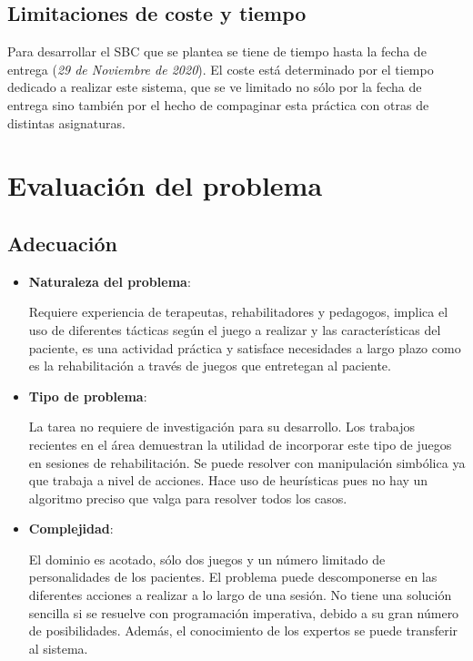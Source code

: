 \documentclass{uc3mpracticas}
\begin{document}
  \subsection{Limitaciones de coste y tiempo}

  Para desarrollar el SBC que se plantea se tiene de tiempo hasta la fecha de entrega (\textit{29 de Noviembre de 2020}). El coste está determinado por el tiempo dedicado a realizar este sistema, que se ve limitado no sólo por la fecha de entrega sino también por el hecho de compaginar esta práctica con otras de distintas asignaturas.

  \section{Evaluación del problema}
  \subsection{Adecuación}

  \begin{itemize}
    \item \textbf{Naturaleza del problema}:

    Requiere experiencia de terapeutas, rehabilitadores y pedagogos, implica el uso de diferentes tácticas según el juego a realizar y las características del paciente, es una actividad práctica y satisface necesidades a largo plazo como es la rehabilitación a través de juegos que entretegan al paciente.

    \item \textbf{Tipo de problema}:

    La tarea no requiere de investigación para su desarrollo. Los trabajos recientes en el área demuestran la utilidad de incorporar este tipo de juegos en sesiones de rehabilitación. Se puede resolver con manipulación simbólica ya que trabaja a nivel de acciones. Hace uso de heurísticas pues no hay un algoritmo preciso que valga para resolver todos los casos.

    \item \textbf{Complejidad}:

    El dominio es acotado, sólo dos juegos y un número limitado de personalidades de los pacientes. El problema puede descomponerse en las diferentes acciones a realizar a lo largo de una sesión. No tiene una solución sencilla si se resuelve con programación imperativa, debido a su gran número de posibilidades. Además, el conocimiento de los expertos se puede transferir al sistema.
  \end{itemize}
\end{document}
